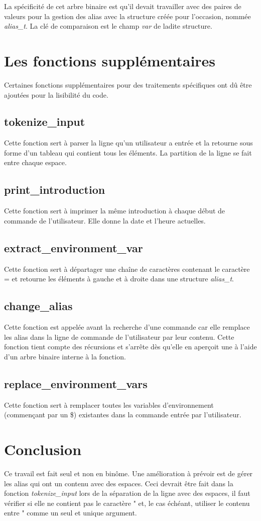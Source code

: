 \documentclass[a4paper,10pt]{article}
\begin{document}
La spécificité de cet arbre binaire est qu'il devait travailler avec des paires de valeurs pour la gestion des alias avec la structure créée pour l'occasion, nommée \emph{alias\_t}. La clé de comparaison est le champ \emph{var} de ladite structure.
\section{Les fonctions supplémentaires}
Certaines fonctions supplémentaires pour des traitements spécifiques ont dû être ajoutées pour la lisibilité du code.
\subsection{tokenize\_input}
Cette fonction sert à parser la ligne qu'un utilisateur a entrée et la retourne sous forme d'un tableau qui contient tous les éléments. La partition de la ligne se fait entre chaque espace.
\subsection{print\_introduction}
Cette fonction sert à imprimer la même introduction à chaque début de commande de l'utilisateur. Elle donne la date et l'heure actuelles.
\subsection{extract\_environment\_var}
Cette fonction sert à départager une chaîne de caractères contenant le caractère = et retourne les éléments à gauche et à droite dans une structure \emph{alias\_t}.
\subsection{change\_alias}
Cette fonction est appelée avant la recherche d'une commande car elle remplace les alias dans la ligne de commande de l'utilisateur par leur contenu. Cette fonction tient compte des récursions et s'arrête dès qu'elle en aperçoit une à l'aide d'un arbre binaire interne à la fonction.
\subsection{replace\_environment\_vars}
Cette fonction sert à remplacer toutes les variables d'environnement (commençant par un \$) existantes dans la commande entrée par l'utilisateur.
\section{Conclusion}
Ce travail est fait seul et non en binôme.
Une amélioration à prévoir est de gérer les alias qui ont un contenu avec des espaces. Ceci devrait être fait dans la fonction \emph{tokenize\_input} lors de la séparation de la ligne avec des espaces, il faut vérifier si elle ne contient pas le caractère " et, le cas échéant, utiliser le contenu entre " comme un seul et unique argument.


\end{document}
